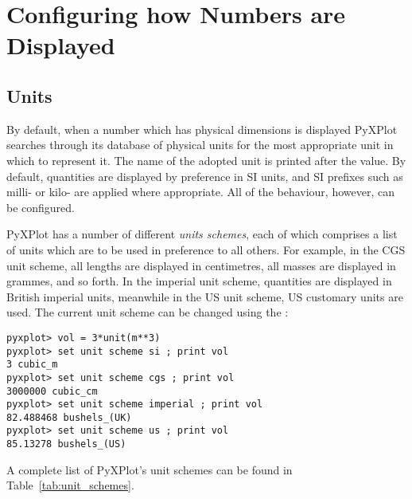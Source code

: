 
\section{Configuring how Numbers are Displayed}
\label{sec:unitdisp}

\subsection{Units}

By default, when a number which has physical dimensions is displayed PyXPlot
searches through its database of physical units for the most appropriate unit
in which to represent it. The name of the adopted unit is printed after the
value. By default, quantities are displayed by preference in SI units, and SI
prefixes such as milli- or kilo- are applied where appropriate. All of the
behaviour, however, can be configured.

PyXPlot has a number of different {\it units schemes}, each of which comprises a list of units which are to be used in
preference to all others. For example, in the CGS unit scheme, all lengths are displayed in centimetres, all masses
are displayed in grammes, and so forth. In the imperial unit
scheme, quantities are displayed in
British imperial units, meanwhile in the US unit scheme, US customary units are
used. The current unit scheme can be changed using the :

\begin{verbatim}
pyxplot> vol = 3*unit(m**3)
pyxplot> set unit scheme si ; print vol
3 cubic_m
pyxplot> set unit scheme cgs ; print vol
3000000 cubic_cm
pyxplot> set unit scheme imperial ; print vol
82.488468 bushels_(UK)
pyxplot> set unit scheme us ; print vol
85.13278 bushels_(US)
\end{verbatim}

\noindent A complete list of PyXPlot's unit schemes can be found in
Table~\ref{tab:unit_schemes}.


